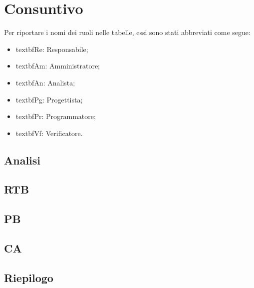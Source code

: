 \section{Consuntivo}

Per riportare i nomi dei ruoli nelle tabelle, essi sono stati abbreviati come segue:
\begin{itemize}
  \item textbf{Re:} Responsabile;
  \item textbf{Am:} Amministratore;
  \item textbf{An:} Analista;
  \item textbf{Pg:} Progettista;
  \item textbf{Pr:} Programmatore;
  \item textbf{Vf:} Verificatore.
\end{itemize}

\subsection{Analisi}


\subsection{RTB}


\subsection{PB}


\subsection{CA}


\subsection{Riepilogo}

